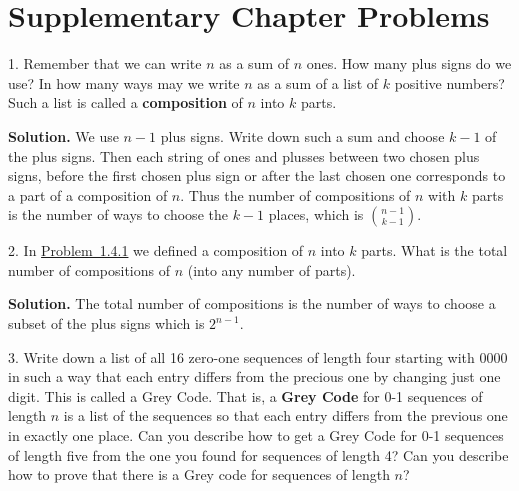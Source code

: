 \documentclass[10pt,]{book}
\newcommand{\terminology}[1]{\textbf{#1}}
\theoremstyle{plain}
\theoremstyle{definition}
\theoremstyle{definition}
\numberwithin{equation}{chapter}
\begin{document}
\section[{Supplementary Chapter Problems}]{Supplementary Chapter Problems}\label{sec_whatis-suppprobs}
\begin{exerciselist}
\item[1.]\hypertarget{compositiondefinition}{}Remember that we can write \(n\) as a sum of \(n\) ones.  How many plus signs do we use?  In how many ways may we write \(n\) as a sum of a list of \(k\) positive numbers?  Such a list is called a \terminology{composition} of \(n\) into \(k\) parts.%
\par\smallskip
\par\smallskip
\noindent\textbf{Solution.}\hypertarget{solution-108}{}\quad
We use \(n-1\) plus signs. Write down such a sum and choose \(k-1\) of the plus signs. Then each string of ones and plusses between two chosen plus signs, before the first chosen plus sign or after the last chosen one corresponds to a part of a composition of \(n\). Thus the number of compositions of \(n\) with \(k\) parts is the number of ways to choose the \(k-1\) places, which is \(\binom{n-1}{k-1}\).%
\item[2.]\hypertarget{composition_numberof}{}In \hyperlink{compositiondefinition}{Problem~1.4.1} we defined a composition of \(n\) into \(k\) parts.  What is the total number of compositions of \(n\) (into any number of parts). %
\par\smallskip
\par\smallskip
\noindent\textbf{Solution.}\hypertarget{solution-109}{}\quad
The total number of compositions is the number of ways to choose a subset of the plus signs which is \(2^{n-1}\).%
\item[3.]\hypertarget{GreyCode}{}Write down a list of all 16 zero-one sequences of length four starting with 0000 in such a way that each entry differs from the precious one by changing just one digit.  This is called a Grey Code. That is, a \terminology{Grey Code} for 0-1 sequences of length \(n\) is a list of the sequences so that each entry differs from the previous one in exactly one place.  Can you describe how to get a Grey Code for 0-1 sequences of length five from the one you found for sequences of length 4?  Can you describe how to prove that there is a Grey code for sequences of length \(n\)?%
\par\smallskip

\end{exerciselist}
\end{document}

